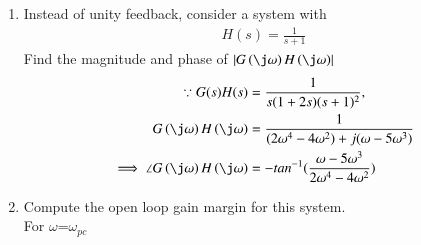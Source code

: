 \begin{enumerate}[label=\thesection.\arabic*.,ref=\thesection.\theenumi]
\item Instead of unity feedback, consider a system with 
%
\begin{align}
H(s)=\frac{1}{s+1}
\end{align}
%
Find the magnitude and phase of $\abs{G\brak{\j\omega}H\brak{\j\omega}}$
\\
\solution 
%
\begin{align}
\because G(s)H(s) & =\frac{1}{s(1+2s)(s+1)^{2}},
\\
G\brak{\j\omega}H\brak{\j\omega} &= \frac{1}{(2\omega^4-4\omega^2) +j(\omega-5\omega^3)}
\\
\implies \angle G\brak{\j\omega}H\brak{\j\omega} &= -tan^{-1}(\frac{\omega-5\omega^3}{2\omega^4-4\omega^2})
\end{align}

\item Compute the open loop gain margin for this system.
\\
\solution 
For $\omega$=$\omega_{pc}$ 


\end{enumerate}
